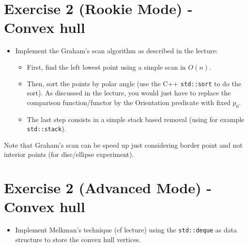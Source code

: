 \documentclass[a4paper, 11pt]{article}
\begin{document}
\section*{Exercise 2 (Rookie Mode) - \rm Convex hull}

\begin{itemize}
	\item Implement the Graham's scan algorithm as described in the lecture:
		\begin{itemize}
        \item First, find the left lowest point using a simple scan in $O(n)$.
        \item Then, sort the points by polar angle (use the C++ \texttt{std::sort} to do the sort).
            As discussed in the lecture, you would just have to replace the comparison function/functor by the Orientation predicate with fixed $p_0$.
		\item The last step consists in a simple stack based removal (using for example \texttt{std::stack}).
		\end{itemize}
\end{itemize}

\par Note that Graham's scan can be speed up just considering border point and not interior points (for disc/ellipse experiment).

\section*{Exercise 2 (Advanced Mode) - \rm Convex hull}

\begin{itemize}
	\item Implement Melkman's technique (cf lecture) using the \texttt{std::deque} as data structure to store the convex hull vertices.
\end{itemize}
\end{document}
